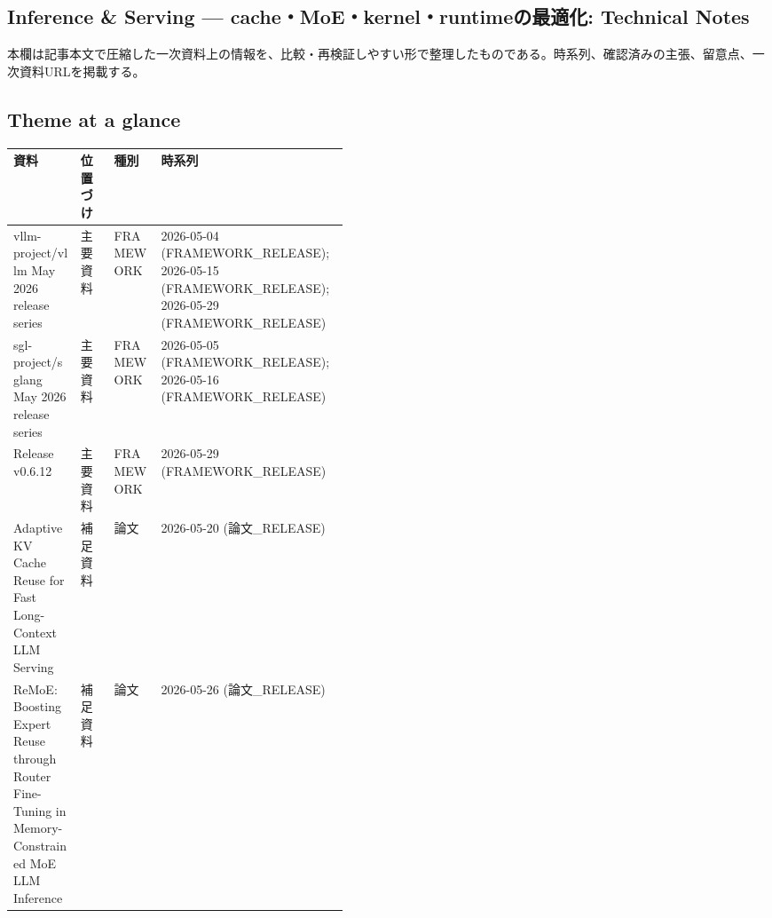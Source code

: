 \subsection*{Inference \& Serving — cache・MoE・kernel・runtimeの最適化: Technical Notes}
本欄は記事本文で圧縮した一次資料上の情報を、比較・再検証しやすい形で整理したものである。時系列、確認済みの主張、留意点、一次資料URLを掲載する。
\medskip
\subsection*{Theme at a glance}
\begin{center}
\footnotesize
\begin{tabularx}{\linewidth}{@{}p{0.20\linewidth}p{0.10\linewidth}p{0.14\linewidth}X@{}}
\toprule
資料 & 位置づけ & 種別 & 時系列 \\
\midrule
vllm-project/vllm May 2026 release series & 主要資料 & FRAMEWORK & 2026-05-04 (FRAMEWORK\_RELEASE); 2026-05-15 (FRAMEWORK\_RELEASE); 2026-05-29 (FRAMEWORK\_RELEASE) \\
sgl-project/sglang May 2026 release series & 主要資料 & FRAMEWORK & 2026-05-05 (FRAMEWORK\_RELEASE); 2026-05-16 (FRAMEWORK\_RELEASE) \\
Release v0.6.12 & 主要資料 & FRAMEWORK & 2026-05-29 (FRAMEWORK\_RELEASE) \\
Adaptive KV Cache Reuse for Fast Long-Context LLM Serving & 補足資料 & 論文 & 2026-05-20 (論文\_RELEASE) \\
ReMoE: Boosting Expert Reuse through Router Fine-Tuning in Memory-Constrained MoE LLM Inference & 補足資料 & 論文 & 2026-05-26 (論文\_RELEASE) \\
\bottomrule
\end{tabularx}
\end{center}
\normalsize

